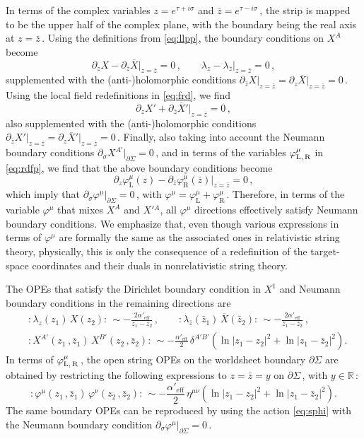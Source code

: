 \documentclass[11pt]{article}
\newcommand{\be}{\begin{equation}}
\newcommand{\ee}{\end{equation}}
\newcommand{\lr}{\left (}
\newcommand{\rr}{\right )}
\newcommand{\p}{\partial}
\begin{document}
In terms of the complex variables $z = e^{\tau + i \sigma}$ and $\bar{z} = e^{\tau - i \sigma}$\,, the strip is mapped to be the upper half of the complex plane, with the boundary being the real axis at $z = \bar{z}$\,. Using the definitions from \eqref{eq:llpp}, the boundary conditions on $X^A$ become \cite{Danielsson:2000mu}
%
\be
    \p_z X - \p_{\bar{z}} \overline{X} \big|_{z = \bar{z}} = 0\,, 
        \qquad%
    \lambda_z - \lambda_{\bar{z}} \big|_{z=\bar{z}} = 0\,,
\ee
%
supplemented with the (anti-)holomorphic conditions $\p_{\bar{z}} X \big|_{z=\bar{z}} = \p_z \overline{X} \big|_{z=\bar{z}} = 0$\,.  
Using the local field redefinitions in \eqref{eq:frd}, we find
%
\be
    \p_z X' + \p_{\bar{z}} \overline{X}{}' \big|_{z=\bar{z}} = 0\,,
\ee
%
also supplemented with the (anti-)holomorphic conditions $\p_{\bar{z}} X' \big|_{z=\bar{z}} = \p_z \overline{X}{}' \big|_{z=\bar{z}} = 0$\,. Finally, also taking into account the Neumann boundary conditions $\p_\sigma X^{A'} \big|_{\p\Sigma} = 0$\,, and in terms of the variables $\varphi_{\text{L,\,R}}^\mu$ in \eqref{eq:rdfp}, we find that the above boundary conditions become
%
\be \label{eq:bcphi}
      \p_z \varphi^{\mu}_\text{L} (z) - \p_{\bar{z}} \varphi^{\mu}_\text{R} (\bar{z}) \big|_{z=\bar{z}} = 0\,,
\ee
%
which imply that $\p_\sigma \varphi^\mu \big|_{\p\Sigma} = 0$\,,
%
with $\varphi^\mu = \varphi^\mu_\text{L} + \varphi^\mu_\text{R}$\,.
Therefore, in terms of the variable $\varphi^\mu$ that mixes $X^A$ and ${X'}{}^A$, all $\varphi^\mu$ directions effectively satisfy Neumann boundary conditions. We emphasize that, even though various expressions in terms of $\varphi^\mu$ are formally the same as the associated ones in relativistic string theory, physically, this is only the consequence of a redefinition of the target-space coordinates and their duals in nonrelativistic string theory.

The OPEs that satisfy the Dirichlet boundary condition in $X^1$ and Neumann boundary conditions in the remaining directions are
%
\begin{subequations} 
\begin{align}
    & :\!\lambda_z (z_1) \, X(z_2) \!: \, \sim - \frac{2\alpha'_\text{eff}}{z_1 - z_2}\,,
        \qquad
    :\! \lambda_{\bar{z}} (\bar{z}_1) \, \overline{X}(\bar{z}_2) \!: \, \sim - \frac{2\alpha'_\text{eff}}{\bar{z}_1 - \bar{z}_2}\,, \\[2pt]
    & : \! X^{A'} \! (z_1\,, \bar{z}_1) \, X^{B'} \! (z_2\,, \bar{z}_2) \!: \, \sim - \frac{\alpha'_\text{eff}}{2} \, \delta^{A'B'} \lr \ln |z_1 - z_2|^2 + \ln |z_1 - \bar{z}_2|^2 \rr.
\end{align}
\end{subequations}
%
In terms of $\varphi^\mu_\text{L,\,R}$\,, the open string OPEs on the worldsheet boundary $\p\Sigma$ are obtained by restricting the following expressions to $z = \bar{z} = y$ on $\p\Sigma$\,, with $y \in \mathbb{R}$\,: 
%
\be \label{eq:operelphi}
    : \! \varphi^\mu \! (z_1\,, \bar{z}_1) \, \varphi^\nu \! (z_2\,, \bar{z}_2) \!: \, \sim - \frac{\alpha'_\text{eff}}{2} \, \eta^{\mu\nu} \lr \ln |z_1 - z_2|^2 + \ln |z_1 - \bar{z}_2|^2 \rr.
\ee
%
The same boundary OPEs can be reproduced by using the action \eqref{eq:sphi} with the Neumann boundary condition $\p_\sigma \varphi^\mu \big|_{\p\Sigma} = 0$\,.  
\end{document}
